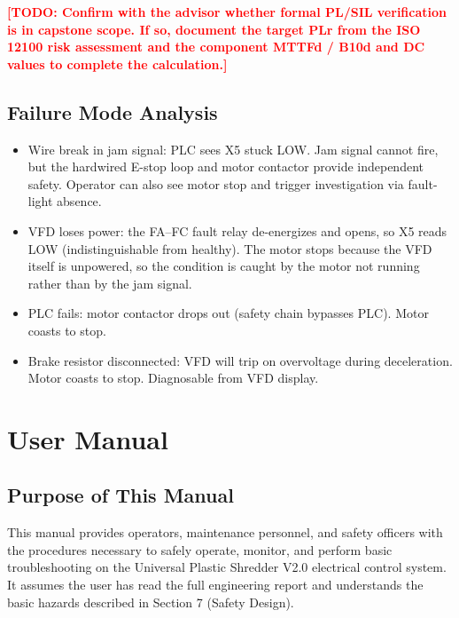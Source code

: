 \documentclass[hidelinks,12pt]{article}
\newcommand{\todo}[1]{\textcolor{red}{\textbf{[TODO: #1]}}}
\begin{document}
\todo{Confirm with the advisor whether formal PL/SIL verification is in capstone scope. If so, document the target PLr from the ISO 12100 risk assessment and the component MTTFd / B10d and DC values to complete the calculation.}

\subsection{Failure Mode Analysis}
\begin{itemize}
    \item Wire break in jam signal: PLC sees X5 stuck LOW. Jam signal cannot fire, but the hardwired E-stop loop and motor contactor provide independent safety. Operator can also see motor stop and trigger investigation via fault-light absence.
    \item VFD loses power: the FA--FC fault relay de-energizes and opens, so X5 reads LOW (indistinguishable from healthy). The motor stops because the VFD itself is unpowered, so the condition is caught by the motor not running rather than by the jam signal.
    \item PLC fails: motor contactor drops out (safety chain bypasses PLC). Motor coasts to stop.
    \item Brake resistor disconnected: VFD will trip on overvoltage during deceleration. Motor coasts to stop. Diagnosable from VFD display.
\end{itemize}

\newpage
\section{User Manual}

\subsection{Purpose of This Manual}
This manual provides operators, maintenance personnel, and safety officers with the procedures necessary to safely operate, monitor, and perform basic troubleshooting on the Universal Plastic Shredder V2.0 electrical control system. It assumes the user has read the full engineering report and understands the basic hazards described in Section 7 (Safety Design).
\end{document}
